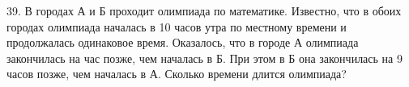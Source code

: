 39. В городах А и Б проходит олимпиада по математике. Известно, что в обоих городах олимпиада началась в 10 часов утра по местному времени и продолжалась одинаковое время. Оказалось, что в городе А олимпиада закончилась на час позже, чем началась в Б. При этом в Б она закончилась на 9 часов позже, чем началась в А. Сколько времени длится олимпиада?\\
